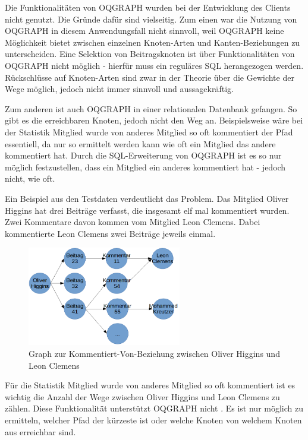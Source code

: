 Die Funktionalitäten von OQGRAPH wurden bei der Entwicklung des Clients nicht genutzt. Die Gründe dafür sind vielseitig. Zum einen war die Nutzung von OQGRAPH in diesem Anwendungsfall nicht sinnvoll, weil OQGRAPH keine Möglichkeit bietet zwischen einzelnen Knoten-Arten und Kanten-Beziehungen zu unterscheiden. Eine Selektion von Beitragsknoten ist über Funktionalitäten von OQGRAPH nicht möglich - hierfür muss ein reguläres SQL herangezogen werden. Rückschlüsse auf Knoten-Arten sind zwar in der Theorie über die Gewichte der Wege möglich, jedoch nicht immer sinnvoll und aussagekräftig.

Zum anderen ist auch OQGRAPH in einer relationalen Datenbank \grqq gefangen\grqq{}. So gibt es die erreichbaren Knoten, jedoch nicht den Weg an. Beispielsweise wäre bei der Statistik \grqq Mitglied wurde von anderes Mitglied so oft kommentiert\grqq{} der Pfad essentiell, da nur so ermittelt werden kann wie oft ein Mitglied das andere kommentiert hat. Durch die SQL-Erweiterung von OQGRAPH ist es so nur möglich festzustellen, dass ein Mitglied ein anderes kommentiert hat - jedoch nicht, wie oft.

Ein Beispiel aus den Testdaten verdeutlicht das Problem. Das Mitglied \grqq Oliver Higgins\grqq{} hat drei Beiträge verfasst, die insgesamt elf mal kommentiert wurden. Zwei Kommentare davon kommen vom Mitglied \grqq Leon Clemens\grqq{}. Dabei kommentierte Leon Clemens zwei Beiträge jeweils einmal.

\begin{figure}	
	\centering
	\includegraphics[width=0.6\textwidth]{images/graph.png}
	\caption{Graph zur Kommentiert-Von-Beziehung zwischen Oliver Higgins und Leon Clemens}
\end{figure}

Für die Statistik \grqq Mitglied wurde von anderes Mitglied so oft kommentiert\grqq{} ist es wichtig die Anzahl der Wege zwischen Oliver Higgins und Leon Clemens zu zählen. Diese Funktionalität unterstützt OQGRAPH nicht \cite{OQGRAPH-Examples}. Es ist nur möglich zu ermitteln, welcher Pfad der kürzeste ist oder welche Knoten von welchem Knoten aus erreichbar sind.


